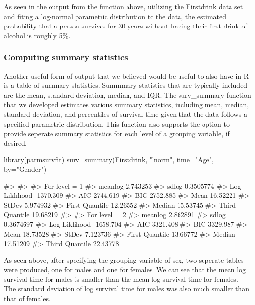 As seen in the output from the function above, utilizing the Firstdrink
data set and fiting a log-normal parametric distribution to the data,
the estimated probability that a person survives for 30 years without
having their first drink of alcohol is roughly 5\%.

\hypertarget{computing-summary-statistics}{%
\subsubsection{Computing summary
statistics}\label{computing-summary-statistics}}

Another useful form of output that we believed would be useful to also
have in R is a table of summary statistics. Summmary statistics that are
typically included are the mean, standard deviation, median, and IQR.
The surv\_summary function that we developed estimates various summary
statistics, including mean, median, standard deviation, and percentiles
of survival time given that the data follows a specified parametric
distribution. This function also supports the option to provide seperate
summary statistics for each level of a grouping variable, if desired.

\begin{Schunk}
\begin{Sinput}
library(parmsurvfit)
surv_summary(Firstdrink, "lnorm", time="Age", by="Gender")
\end{Sinput}
\begin{Soutput}
#> 
#> 
#> For level = 1 
#> meanlog      2.743253
#> sdlog        0.3505774
#> Log Liklihood    -1370.309
#> AIC      2744.619
#> BIC      2752.885
#> Mean     16.52221
#> StDev        5.974932
#> First Quantile   12.26552
#> Median       15.53745
#> Third Quantile   19.68219
#> 
#> For level = 2 
#> meanlog      2.862891
#> sdlog        0.3674697
#> Log Liklihood    -1658.704
#> AIC      3321.408
#> BIC      3329.987
#> Mean     18.73528
#> StDev        7.123736
#> First Quantile   13.66772
#> Median       17.51209
#> Third Quantile   22.43778
\end{Soutput}
\end{Schunk}

As seen above, after specifying the grouping variable of sex, two
seperate tables were produced, one for males and one for females. We can
see that the mean log survival time for males is smaller than the mean
log survival time for females. The standard deviation of log survival
time for males was also much smaller than that of females.

